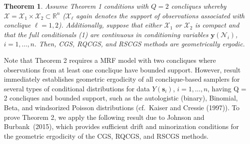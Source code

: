 \documentclass[12pt]{article}
\newtheorem{theorem}{Theorem}
\theoremstyle{definition}
\begin{document}
\setcounter{theorem}{1}

\begin{theorem}
\label{thm:2}
Assume Theorem 1 conditions with $Q=2$ concliques whereby $\mathcal{X} = \mathcal{X}_1\times\mathcal{X}_2 \subset \mathbb{R}^n$ ($\mathcal{X}_\ell$ again denotes the support of observations associated with conclique $\ell = 1,2$). Additionally, suppose that either $\mathcal{X}_1$ or $\mathcal{X}_2$ is compact and that the full conditionals (1) are continuous in conditioning variables $\boldsymbol y(\mathcal{N}_i)$, $i = 1, \dots, n$. Then, CGS, RQCGS, and RSCGS methods are geometrically ergodic.
\end{theorem}

Note that Theorem 2 requires a MRF model with two concliques where observations from at least one conclique have bounded support. However, result immediately establishes geometric ergodicity of all conclique-based samplers for several types of conditional distributions for data $Y(\boldsymbol{s}_i)$, $i=1,\ldots,n$, having Q = 2 concliques and bounded support, such as the autologistic (binary), Binomial, Beta, and windsorized Poisson distributions (cf.~Kaiser and Cressie (1997)). To prove Theorem 2, we apply the following result due to Johnson and Burbank~(2015), which 
  provides sufficient drift and minorization conditions for the geometric ergodicity of the CGS, RQCGS, and RSCGS methods.
\end{document}
